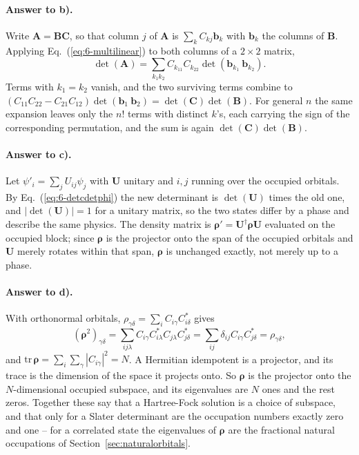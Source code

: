 \paragraph{Answer to b).}
Write $\bm{A}=\bm{B}\bm{C}$, so that column $j$ of $\bm{A}$ is
$\sum_k C_{kj}\bm{b}_k$ with $\bm{b}_k$ the columns of $\bm{B}$.  Applying
Eq.~(\ref{eq:6-multilinear}) to both columns of a $2\times2$ matrix,
\begin{equation}
  \det(\bm{A}) = \sum_{k_1k_2}C_{k_11}C_{k_22}
    \det\left(\bm{b}_{k_1}\ \bm{b}_{k_2}\right) .
  \label{eq:6-exb1}
\end{equation}
Terms with $k_1=k_2$ vanish, and the two surviving terms combine to
$(C_{11}C_{22}-C_{21}C_{12})\det(\bm{b}_1\ \bm{b}_2)
=\det(\bm{C})\det(\bm{B})$.  For general $n$ the same expansion leaves only
the $n!$ terms with distinct $k$'s, each carrying the sign of the
corresponding permutation, and the sum is again $\det(\bm{C})\det(\bm{B})$.

\paragraph{Answer to c).}
Let $\psi'_i=\sum_j U_{ij}\psi_j$ with $\bm{U}$ unitary and $i,j$ running over
the occupied orbitals.  By Eq.~(\ref{eq:6-detcdetphi}) the new determinant is
$\det(\bm{U})$ times the old one, and $|\det(\bm{U})|=1$ for a unitary matrix,
so the two states differ by a phase and describe the same physics.  The
density matrix is $\bm{\rho}'=\bm{U}^{\dagger}\bm{\rho}\bm{U}$ evaluated on
the occupied block; since $\bm{\rho}$ is the projector onto the span of the
occupied orbitals and $\bm{U}$ merely rotates within that span, $\bm{\rho}$ is
unchanged exactly, not merely up to a phase.

\paragraph{Answer to d).}
With orthonormal orbitals,
$\rho_{\gamma\delta}=\sum_i C_{i\gamma}C^{*}_{i\delta}$ gives
\begin{equation}
  (\bm{\rho}^2)_{\gamma\delta}
  = \sum_{i j\lambda}C_{i\gamma}C^{*}_{i\lambda}C_{j\lambda}C^{*}_{j\delta}
  = \sum_{ij}\delta_{ij}C_{i\gamma}C^{*}_{j\delta}
  = \rho_{\gamma\delta},
  \label{eq:6-exd1}
\end{equation}
and $\mathrm{tr}\,\bm{\rho}=\sum_i\sum_{\gamma}|C_{i\gamma}|^2=N$.  A
Hermitian idempotent is a projector, and its trace is the dimension of the
space it projects onto.  So $\bm{\rho}$ is the projector onto the
$N$-dimensional occupied subspace, and its eigenvalues are $N$ ones and the
rest zeros.  Together these say that a Hartree-Fock solution is a choice of
subspace, and that only for a Slater determinant are the occupation numbers
exactly zero and one -- for a correlated state the eigenvalues of $\bm{\rho}$
are the fractional natural occupations of
Section~\ref{sec:naturalorbitals}.

